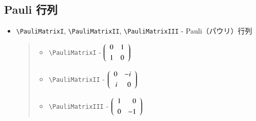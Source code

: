 \documentclass[oneside,10pt,a4paper]{jsarticle}
\begin{document}
  \subsection{Pauli 行列}

  \begin{itemize}
    \item \verb|\PauliMatrixI|, \verb|\PauliMatrixII|, \verb|\PauliMatrixIII| - Pauli（パウリ）行列
      \begin{quote}
        \Example
        \begin{itemize}
          \item \verb|\PauliMatrixI| - $\PauliMatrixI$
          \item \verb|\PauliMatrixII| - $\PauliMatrixII$
          \item \verb|\PauliMatrixIII| - $\PauliMatrixIII$
        \end{itemize}
      \end{quote}
  \end{itemize}
\end{document}
